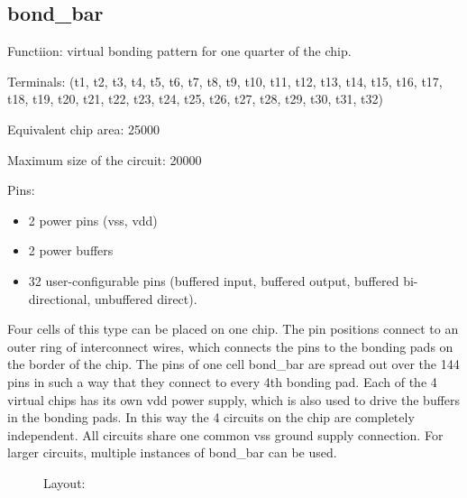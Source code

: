 \subsection{bond\_bar}

Functiion: virtual bonding pattern for one quarter of the chip.

Terminals: (t1, t2, t3, t4, t5, t6, t7, t8, t9, t10, t11, t12, 
                  t13, t14, t15, t16, t17, t18, t19, t20, t21, t22, t23, t24, 
                  t25, t26, t27, t28, t29, t30, t31, t32)

Equivalent chip area: 25000

Maximum size of the circuit: 20000

Pins:
\begin{itemize}
\item
2 power pins (vss, vdd)
\item
2 power buffers
\item
32 user-configurable pins (buffered input, buffered output, buffered
bi-directional, unbuffered direct).
\end{itemize}

Four cells of this type can be placed on one chip. The pin positions
connect to an outer ring of interconnect wires, which connects the
pins to the bonding pads on the border of the chip. The pins of one
cell bond\_bar are spread out over the 144 pins in such a way that
they connect to every 4th bonding pad. Each of the 4 virtual chips
has its own vdd power supply, which is also used to drive the
buffers in the bonding pads. In this way the 4 circuits on the chip
are completely independent. All circuits share one common vss ground
supply connection. For larger circuits, multiple instances of
bond\_bar can be used.

\begin{figure}[bth]
Layout:\\

\end{figure}

\clearpage
